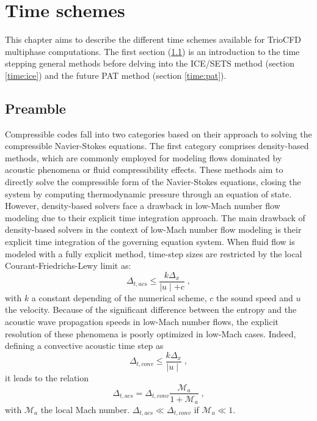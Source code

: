 \chapter{Time schemes}
\label{sec:time_scheme}
This chapter aims to describe the different time schemes available for TrioCFD multiphase computations. The first section (\ref{time:preambule}) is an introduction to the time stepping general methods before delving into the ICE/SETS method (section \ref{time:ice}) and the future PAT method (section \ref{time:pat}).
\section{Preamble}\label{time:preambule}
Compressible codes fall into two categories based on their approach to solving the compressible Navier-Stokes equations. The first category comprises density-based methods, which are commonly employed for modeling flows dominated by acoustic phenomena or fluid compressibility effects. These methods aim to directly solve the compressible form of the Navier-Stokes equations, closing the system by computing thermodynamic pressure through an equation of state. However, density-based solvers face a drawback in low-Mach number flow modeling due to their explicit time integration approach. 
The main drawback of density-based solvers in the context of low-Mach number flow modeling is their explicit time integration of the governing equation system. When fluid flow is modeled with a fully explicit method, time-step sizes are restricted by the local Courant-Friedrichs-Lewy limit as:
\begin{equation}
    \label{eq:time_step_compressible1}
    \Delta_{t,acs} \leq \frac{k \Delta_x}{\mid u\mid + c} \; ,
\end{equation}
with $k$ a constant depending of the numerical scheme, $c$ the sound speed and $u$ the velocity. Because of the significant difference between the entropy and the acoustic wave propagation speeds in low-Mach number flows, the explicit resolution of these phenomena is poorly optimized in low-Mach cases. Indeed, defining a convective acoustic time step as 
\begin{equation}
    \label{eq:time_step_compressible2}
    \Delta_{t,conv} \leq \frac{k \Delta_x}{\mid u\mid} \; ,
\end{equation}
it leads to the relation
\begin{equation}
    \label{eq:time_step_compressible3}
    \Delta_{t,acs} = \Delta_{t,conv} \frac{\mathcal{M}_a}{1+ \mathcal{M}_a} \; ,
\end{equation}
with $\mathcal{M}_a$ the local Mach number. $\Delta_{t,acs} \ll \Delta_{t,conv}$ if $\mathcal{M}_a \ll 1$.

